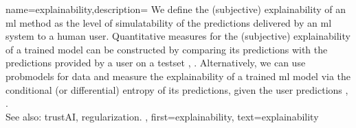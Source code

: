 {name={explainability},description=
		{We define the (subjective) explainability of an \gls{ml} method 
			as the level of simulatability \cite{Colin:2022aa} of the \glspl{prediction} 
			delivered by an \gls{ml} system to a human user. Quantitative measures for the 
			(subjective) explainability of a trained \gls{model} can be constructed by 
			comparing its \glspl{prediction} with the \glspl{prediction} provided by a user 
			on a \gls{testset} \cite{Colin:2022aa}, \cite{Zhang:2024aa}. Alternatively, we can use 
			\glspl{probmodel} for \gls{data} and measure the explainability of a trained \gls{ml} 
			\gls{model} via the conditional (or differential) \gls{entropy} of its \glspl{prediction}, given the user \glspl{prediction} \cite{JunXML2020}, \cite{Chen2018}.
						\\ 
		See also: \gls{trustAI}, \gls{regularization}.
		},
		first={explainability},
		text={explainability}
	}

